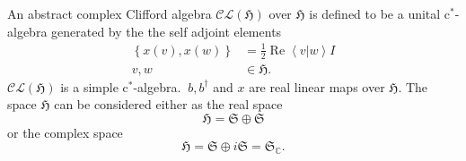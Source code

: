 \documentclass[aps,preprint]{revtex4}%
\begin{document}
An abstract complex Clifford algebra $\mathcal{CL}\left(  \mathfrak{H}\right)
$ over $\mathfrak{H}$ is defined to be a unital c$^{\ast}$-algebra generated
by the the self adjoint elements
\begin{align}
\left\{  x\left(  v\right)  ,x\left(  w\right)  \right\}   &  =\frac{1}%
{2}\operatorname{Re}\left\langle \left.  v\right\vert w\right\rangle I\\
v,w &  \in\mathfrak{H.}%
\end{align}
$\mathcal{CL}\left(  \mathfrak{H}\right)  $ is a simple c$^{\ast}$-algebra$.$
$\mathcal{\ }b,b^{\dagger}$ and $x$ are real linear maps over $\mathfrak{H.}$
The space $\mathfrak{H}$ can be considered either as the real space
\begin{equation}
\mathfrak{H=S}\oplus\mathfrak{S}%
\end{equation}
or the complex space
\begin{equation}
\mathfrak{H=S}\oplus i\mathfrak{S}=\mathfrak{S}_{\mathbb{C}}.
\end{equation}
\end{document}
